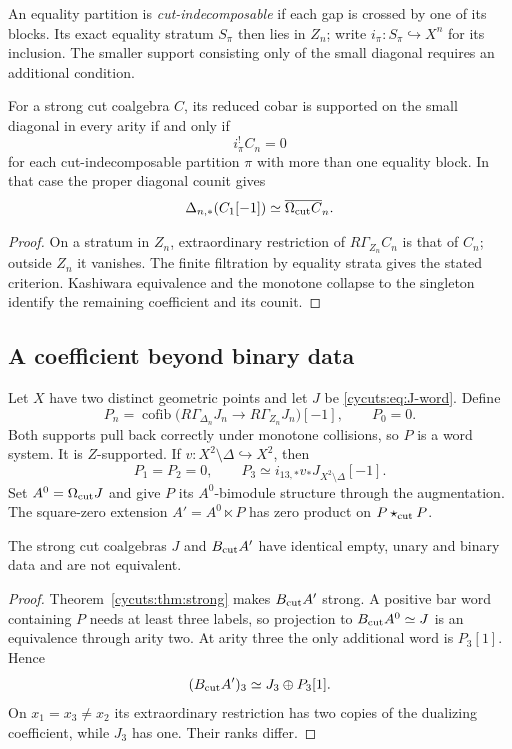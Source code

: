 An equality partition is \emph{cut-indecomposable} if each gap is
crossed by one of its blocks. Its exact equality stratum $S_\pi$
then lies in $Z_n$; write $i_\pi:S_\pi\hookrightarrow X^n$ for its
inclusion. The smaller support consisting only of the
small diagonal requires an additional condition.

\begin{corollary}\label{cycuts:cor:small-diagonal}
For a strong cut coalgebra $C$, its reduced cobar is supported on
the small diagonal in every arity if and only if
\[
 i_\pi^!C_n=0
\]
for each cut-indecomposable partition $\pi$ with more than one
equality block. In that case the proper diagonal counit gives
\[
 \Delta_{n,*}(C_1[-1])\simeq\overline{\Omega_{\mathrm{cut}} C}_n.
\]
\end{corollary}
\begin{proof}
On a stratum in $Z_n$, extraordinary restriction of
$R\Gamma_{Z_n}C_n$ is that of $C_n$; outside $Z_n$ it vanishes.
The finite filtration by equality strata gives the stated criterion.
Kashiwara equivalence and the monotone collapse to the singleton
identify the remaining coefficient and its counit.
\end{proof}

\subsection{A coefficient beyond binary data}

Let $X$ have two distinct geometric points and let $J$ be
\eqref{cycuts:eq:J-word}. Define
\begin{equation}\label{cycuts:eq:hidden}
 P_n=\operatorname{cofib}
 \bigl(R\Gamma_{\Delta_n}J_n\longrightarrow
                       R\Gamma_{Z_n}J_n\bigr)[-1],\qquad P_0=0.
\end{equation}
Both supports pull back correctly under monotone collisions, so $P$
is a word system. It is $Z$-supported. If
$v:X^2\setminus\Delta\hookrightarrow X^2$, then
\[
 P_1=P_2=0,\qquad
 P_3\simeq i_{13,*}v_*J_{X^2\setminus\Delta}[-1].
\]
Set $A^0=\Omega_{\mathrm{cut}} J$ and give $P$ its $A^0$-bimodule structure through
the augmentation. The square-zero extension $A'=A^0\ltimes P$ has
zero product on $P\star_{\mathrm{cut}} P$.

\begin{proposition}\label{cycuts:prop:binary-invisible}
The strong cut coalgebras $J$ and $B_{\mathrm{cut}} A'$ have identical empty,
unary and binary data and are not equivalent.
\end{proposition}
\begin{proof}
Theorem~\ref{cycuts:thm:strong} makes $B_{\mathrm{cut}} A'$ strong. A positive
bar word containing $P$ needs at least three labels, so projection
to $B_{\mathrm{cut}} A^0\simeq J$ is an equivalence through arity two.
At arity three the only additional word is $P_3[1]$. Hence
\[
 (B_{\mathrm{cut}} A')_3\simeq J_3\oplus P_3[1].
\]
On $x_1=x_3\ne x_2$ its extraordinary restriction has two copies
of the dualizing coefficient, while $J_3$ has one. Their ranks differ.
\end{proof}


